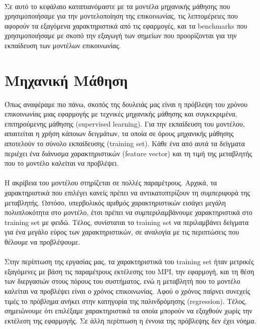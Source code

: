 \paragraph{}

Σε αυτό το κεφάλαιο καταπιανόμαστε με τα μοντέλα μηχανικής μάθησης που χρησιμοποιήσαμε για την μοντελοποίηση της επικοινωνίας, τις λεπτομέρειες που αφορούν τα εξαγόμενα χαρακτηριστικά από τις εφαρμογές, και τα benchmarks που χρησιμοποιήσαμε με σκοπό την εξαγωγή των σημείων που προορίζονται για την εκπαίδευση των μοντέλων επικοινωνίας.


\section{Μηχανική Μάθηση}
Όπως αναφέραμε πιο πάνω, σκοπός της δουλειάς μας είναι η πρόβλεψη του χρόνου επικοινωνίας μιας εφαρμογής με τεχνικές μηχανικής μάθησης και συγκεκριμένα, επιτηρούμενης μάθησης (supervised learning). Για την εκπαίδευση του μοντέλου, απαιτείται η χρήση κάποιων δειγμάτων, τα οποία σε όρους μηχανικής μάθησης αποτελούν το σύνολο εκπαίδευσης (training set). Κάθε ένα από αυτά τα δείγματα περιέχει ένα διάνυσμα χαρακτηριστικών (feature vector) και τη τιμή της μεταβλητής που το μοντέλο καλείται να προβλέψει. 
\paragraph{}
Η ακρίβεια του μοντέλου στηρίζεται σε πολλές παραμέτρους. Αρχικά, τα χαρακτηριστικά που επιλέγει κανείς πρέπει να αντικατοπτρίζουν τη συμπεριφορά της μεταβλητής. Ωστόσο, υπερβολικός αριθμός χαρακτηριστικών εισάγει μεγάλη πολυπλοκότητα στο μοντέλο, έτσι πρέπει να συμπεριλαμβάνουμε χαρακτηριστικά στο training set με φειδώ. Τέλος, συνίσταται το training set να περιλαμβάνει δείγματα για ένα μεγάλο εύρος των χαρακτηριστικών, σε αναλογία με τις περιπτώσεις που θέλουμε να προβλέψουμε.
\paragraph{}
Στην περίπτωση της εργασίας μας, τα χαρακτηριστικά του training set ήταν μετρικές εξαγόμενες με βάση τις παραμέτρους εκτέλεσης του MPI, την εφαρμογή, και τη θέση των διεργασιών στους πόρους του συστήματος, ενώ η μεταβλητή που το μοντέλο καλείται να προβλέψει είναι ο χρόνος επικοινωνίας. Αφού ο χρόνος παίρνει συνεχείς τιμές το πρόβλημα ανήκει στην κατηγορία της παλινδρόμησης (regression). Τέλος, σημειώνουμε ότι επιλέξαμε χαρακτηριστικά τα οποία μπορούν να εξαχθούν χωρίς την εκτέλεση της εφαρμογής. Σε άλλη περίπτωση η έννοια της πρόβλεψης δεν έχει νόημα. 

